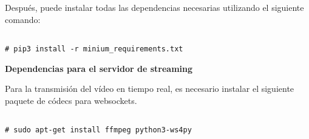 \vspace{-1.4cm}

Después, puede instalar todas las dependencias necesarias utilizando el siguiente comando:

\vspace{-1.4cm}

\begin{verbatim}

# pip3 install -r minium_requirements.txt

\end{verbatim}

\vspace{-1.4cm}

\textbf{Dependencias para el servidor de streaming}

Para la transmisión del vídeo en tiempo real, es necesario instalar el siguiente paquete de códecs para websockets.

\vspace{-1.4cm}

\begin{verbatim}

# sudo apt-get install ffmpeg python3-ws4py

\end{verbatim}

\vspace{-1.4cm}


